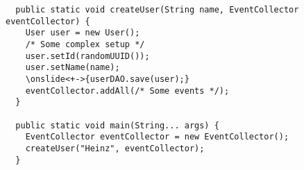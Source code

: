 \begin{lstlisting}
  public static void createUser(String name, EventCollector eventCollector) {
    User user = new User();
    /* Some complex setup */
    user.setId(randomUUID());
    user.setName(name);
    \onslide<+->{userDAO.save(user);}
    eventCollector.addAll(/* Some events */);
  }
  
  public static void main(String... args) {
    EventCollector eventCollector = new EventCollector();
    createUser("Heinz", eventCollector);
  }
\end{lstlisting}
